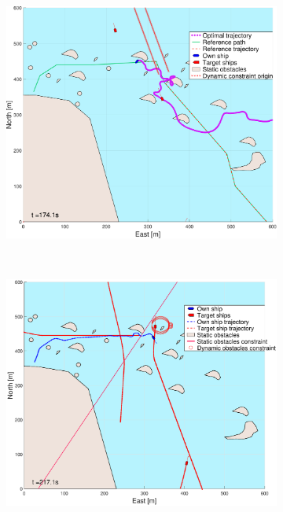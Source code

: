 \begin{figure}[ht]
\begin{subfigure}[b]{0.494\textwidth}
        \subcaption{}
    \end{subfigure}
    \hfill
    \begin{subfigure}[b]{0.494\textwidth}
        \centering
        \includegraphics[width=\textwidth]{Images/NewFigures/skjergard_m_trafikk_NEW/_Simple_1fig999_time=175}
        \subcaption{}
    \end{subfigure}
    \hfill
    \\
    \begin{subfigure}[b]{0.494\textwidth}
        \centering
        \includegraphics[width=\textwidth]{Images/NewFigures/skjergard_m_trafikk_NEW/_Simple_1fig1_time=217}

\end{subfigure}
\end{figure}
